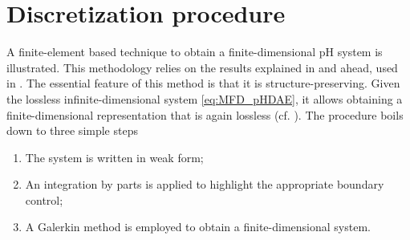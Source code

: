 \documentclass{svjour3}                     %
\newcommand{\secondRev}[1]{\textcolor{blue!80!black}{#1}}
\begin{document}
\section{Discretization procedure}
\label{sec:discr}
A finite-element based technique to obtain a finite-dimensional pH system is illustrated. This methodology relies on the results explained in \cite{cardoso2019partitioned} and ahead, used in \cite{BRUGNOLI2019940,BRUGNOLI2019961}. The essential feature of this method is that it is structure-preserving. Given the lossless infinite-dimensional system \eqref{eq:MFD_pHDAE}, it allows obtaining a finite-dimensional representation that is again lossless \secondRev{(cf. \cite[Definition 3.1.4]{vandershaft2000l2})}. The procedure boils down to three simple steps
\begin{enumerate}
	\item The system is written in weak form; 
	\item An integration by parts is applied to highlight the appropriate boundary control;
	\item A Galerkin method is employed to obtain a finite-dimensional system.
\end{enumerate}
\end{document}
